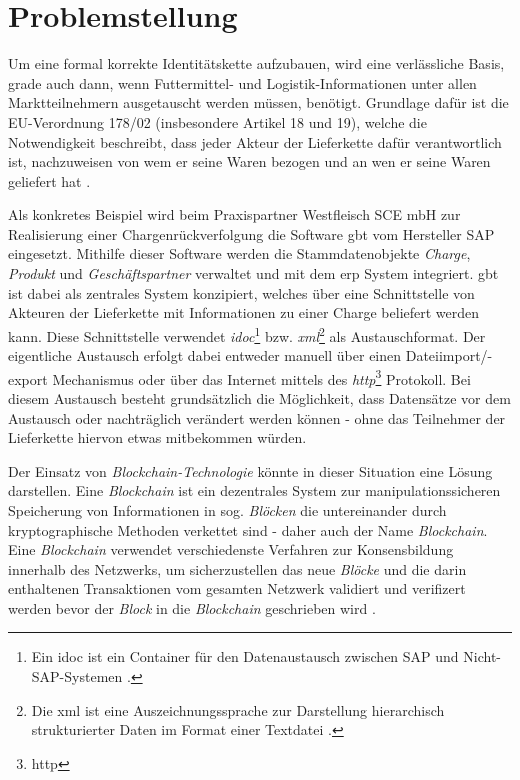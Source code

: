 \section{Problemstellung} \label{Problemstellung}

Um eine formal korrekte Identitätskette aufzubauen, wird eine verlässliche Basis, grade auch dann, wenn Futtermittel- und Logistik-Informationen unter allen Marktteilnehmern ausgetauscht werden müssen, benötigt. Grundlage dafür ist die EU-Verordnung 178/02 (insbesondere Artikel 18 und 19), welche die Notwendigkeit beschreibt, dass jeder Akteur der Lieferkette dafür verantwortlich ist, nachzuweisen von wem er seine Waren bezogen und an wen er seine Waren geliefert hat \citep{EPER2002}.

Als konkretes Beispiel wird beim Praxispartner Westfleisch SCE mbH zur Realisierung einer Chargenrückverfolgung die Software \ac{gbt} vom Hersteller SAP eingesetzt. Mithilfe dieser Software werden die Stammdatenobjekte \textit{Charge}, \textit{Produkt} und \textit{Geschäftspartner} verwaltet und mit dem \ac{erp} System integriert. \ac{gbt} ist dabei als zentrales System konzipiert, welches über eine Schnittstelle von Akteuren der Lieferkette mit Informationen zu einer Charge beliefert werden kann. Diese Schnittstelle verwendet \textit{\acs{idoc}}\footnote{Ein \ac{idoc} ist ein Container für den Datenaustausch zwischen SAP und Nicht-SAP-Systemen \citep{SAP2019}.} bzw. \textit{\acs{xml}}\footnote{Die \ac{xml} ist eine Auszeichnungssprache zur Darstellung hierarchisch strukturierter Daten im Format einer Textdatei \citep{Yergeau2008}.} als Austauschformat. Der eigentliche Austausch erfolgt dabei entweder manuell über einen Dateiimport/-export Mechanismus oder über das Internet mittels des \textit{\acs{http}}\footnote{\ac{http}} Protokoll. Bei diesem Austausch besteht grundsätzlich die Möglichkeit, dass Datensätze vor dem Austausch oder nachträglich verändert werden können - ohne das Teilnehmer der Lieferkette hiervon etwas mitbekommen würden.

Der Einsatz von \textit{Blockchain-Technologie} könnte in dieser Situation eine Lösung darstellen. Eine \textit{Blockchain} ist ein dezentrales System zur manipulationssicheren Speicherung von Informationen in sog. \textit{Blöcken} die untereinander durch kryptographische Methoden verkettet sind - daher auch der Name \textit{Blockchain}. Eine \textit{Blockchain} verwendet verschiedenste Verfahren zur Konsensbildung innerhalb des Netzwerks, um sicherzustellen das neue \textit{Blöcke} und die darin enthaltenen Transaktionen vom gesamten Netzwerk validiert und verifizert werden bevor der \textit{Block} in die \textit{Blockchain} geschrieben wird \citep[siehe auch][]{Nakamoto2009, Buterin2014, Cardano2017, carVertical}.

